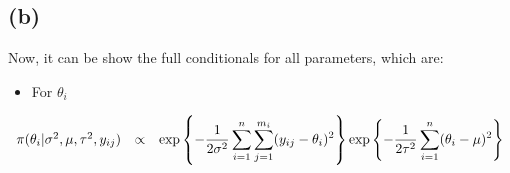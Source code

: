 \documentclass[a4paper, 11pt]{article}
\begin{document}
\subsection*{(b)}\label{sb} Now, it can be show the full conditionals for all parameters, which are:

\begin{itemize}
\item For $\theta_i$
\end{itemize}
\begin{equation*}
\begin{array}{lcl ll }

\pi(\theta_i| \sigma^2, \mu, \tau^2, y_{ij})  & \propto & \mbox{exp}\left\{ - \dfrac{1}{2\sigma^2}\displaystyle\sum_{i=1}^{n}\displaystyle\sum_{j=1}^{m_i}(y_{ij} - \theta_i)^2\right\} \mbox{exp}\left\{ - \dfrac{1}{2\tau^2} 
\displaystyle\sum_{i=1}^{n} (\theta_i - \mu)^2\right\} \\ \\

\end{array}
\end{equation*}
\end{document}
